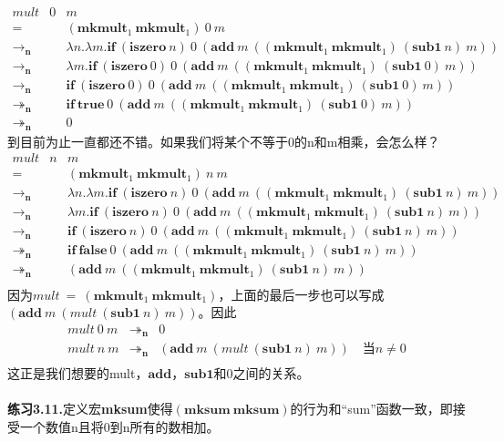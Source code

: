 \documentclass{book}
\def\lianxi{\noindent \makebox[0pt][r]{$\rhd$} \textbf}
\begin{document}
$$
\begin{array}{ccl}
mult & 0 & m \\
= & &  (\mathbf{mkmult}_1\ \mathbf{mkmult}_1)\ 0\  m\\
\rightarrow_\textbf{n} & & \lambda n.\lambda m.\mathbf{if}\ (\mathbf{iszero}\ n)\ 0\ (\mathbf{add}\ m\ ((\mathbf{mkmult}_1\ \mathbf{mkmult}_1)\ (\mathbf{sub1}\ n)\ m))\\
\rightarrow_\textbf{n} & & \lambda m.\mathbf{if}\ (\mathbf{iszero}\ 0)\ 0\ (\mathbf{add}\ m\ ((\mathbf{mkmult}_1\ \mathbf{mkmult}_1)\ (\mathbf{sub1}\ 0)\ m))\\
\rightarrow_\textbf{n} & & \mathbf{if}\ (\mathbf{iszero}\ 0)\ 0\ (\mathbf{add}\ m\ ((\mathbf{mkmult}_1\ \mathbf{mkmult}_1)\ (\mathbf{sub1}\ 0)\ m))\\
\twoheadrightarrow_\textbf{n} & & \mathbf{if}\ \mathbf{true}\ 0\ (\mathbf{add}\ m\ ((\mathbf{mkmult}_1\ \mathbf{mkmult}_1)\ (\mathbf{sub1}\ 0)\ m))\\
\twoheadrightarrow_\textbf{n} & & 0
\end{array}
$$
到目前为止一直都还不错。如果我们将某个不等于0的n和m相乘，会怎么样？
$$
\begin{array}{ccl}
mult & n & m \\
= & &  (\mathbf{mkmult}_1\ \mathbf{mkmult}_1)\ n\  m\\
\rightarrow_\textbf{n} & & \lambda n.\lambda m.\mathbf{if}\ (\mathbf{iszero}\ n)\ 0\ (\mathbf{add}\ m\ ((\mathbf{mkmult}_1\ \mathbf{mkmult}_1)\ (\mathbf{sub1}\ n)\ m))\\
\rightarrow_\textbf{n} & & \lambda m.\mathbf{if}\ (\mathbf{iszero}\ n)\ 0\ (\mathbf{add}\ m\ ((\mathbf{mkmult}_1\ \mathbf{mkmult}_1)\ (\mathbf{sub1}\ n)\ m))\\
\rightarrow_\textbf{n} & & \mathbf{if}\ (\mathbf{iszero}\ n)\ 0\ (\mathbf{add}\ m\ ((\mathbf{mkmult}_1\ \mathbf{mkmult}_1)\ (\mathbf{sub1}\ n)\ m))\\
\twoheadrightarrow_\textbf{n} & & \mathbf{if}\ \mathbf{false}\ 0\ (\mathbf{add}\ m\ ((\mathbf{mkmult}_1\ \mathbf{mkmult}_1)\ (\mathbf{sub1}\ n)\ m))\\
\twoheadrightarrow_\textbf{n} & & (\mathbf{add}\ m\ ((\mathbf{mkmult}_1\ \mathbf{mkmult}_1)\ (\mathbf{sub1}\ n)\ m))\\
\end{array}
$$
因为$mult\ =\ (\mathbf{mkmult}_1\ \mathbf{mkmult}_1)$，上面的最后一步也可以写成$(\mathbf{add}\ m\ (mult\ (\mathbf{sub1}\ n)\ m))$。因此
$$
\begin{array}{lll}
 mult\ 0\ m & \twoheadrightarrow_\textbf{n} & 0\\
 mult\ n\ m & \twoheadrightarrow_\textbf{n} & (\mathbf{add}\ m\ (mult\ (\mathbf{sub1}\ n)\ m))\quad\text{当}n\neq 0\\
\end{array}
$$
这正是我们想要的mult，$\mathbf{add}$，$\mathbf{sub1}$和0之间的关系。\\\\
\lianxi{练习3.11.}定义宏\textbf{mksum}使得$(\mathbf{mksum\ mksum})$的行为和“sum”函数一致，即接受一个数值n且将0到n所有的数相加。
\end{document}
